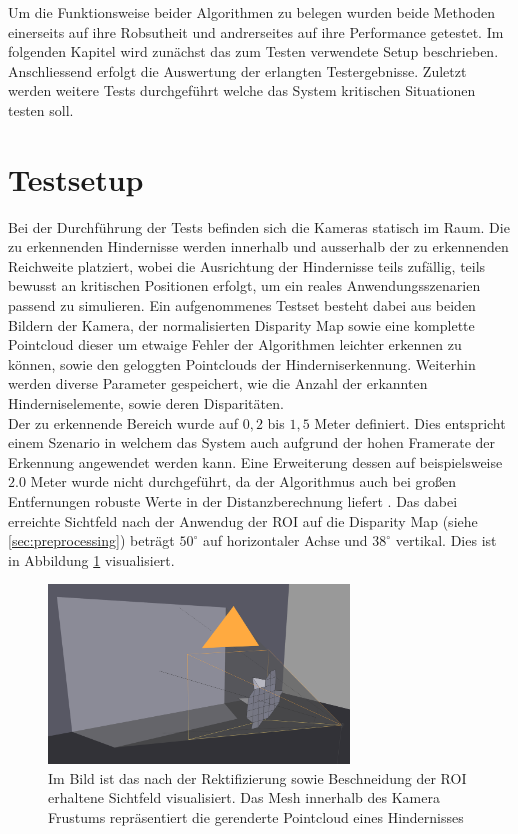 Um die Funktionsweise beider Algorithmen zu belegen wurden beide Methoden einerseits auf ihre Robsutheit und andrerseites auf ihre Performance getestet. Im folgenden Kapitel wird zunächst das zum Testen verwendete Setup beschrieben. Anschliessend erfolgt die Auswertung der erlangten Testergebnisse. Zuletzt werden weitere Tests durchgeführt welche das System kritischen Situationen testen soll.

\section{Testsetup}
\label{sec:test_setup}

Bei der Durchführung der Tests befinden sich die Kameras statisch im Raum. Die zu erkennenden Hindernisse werden innerhalb und ausserhalb der zu erkennenden Reichweite platziert, wobei die Ausrichtung der Hindernisse teils zufällig, teils bewusst an kritischen Positionen erfolgt, um ein reales Anwendungsszenarien passend zu simulieren. Ein aufgenommenes Testset besteht dabei aus beiden Bildern der Kamera, der normalisierten Disparity Map sowie eine komplette Pointcloud dieser um etwaige Fehler der Algorithmen leichter erkennen zu können, sowie den geloggten Pointclouds der Hinderniserkennung. Weiterhin werden diverse Parameter gespeichert, wie die Anzahl der erkannten Hinderniselemente, sowie deren Disparitäten.\\

\noindent
Der zu erkennende Bereich wurde auf $0,2$ bis $1,5$ Meter definiert. Dies entspricht einem Szenario in welchem das System auch aufgrund der hohen Framerate der Erkennung angewendet werden kann. Eine Erweiterung dessen auf beispielsweise $2.0$ Meter wurde nicht durchgeführt, da der Algorithmus auch bei großen Entfernungen robuste Werte in der Distanzberechnung liefert \cite{hilleralhallak}.
Das dabei erreichte Sichtfeld nach der Anwendug der ROI auf die Disparity Map (siehe \ref{sec:preprocessing}) beträgt $50^{\circ}$ auf horizontaler Achse und $38^{\circ}$ vertikal. Dies ist in Abbildung \ref{fig:field_of_view} visualisiert.
	
	\begin{figure}
		\centering
		\includegraphics[width=8cm]{img/viewport}
		\caption{Im Bild ist das nach der Rektifizierung sowie Beschneidung der ROI erhaltene Sichtfeld visualisiert. Das Mesh innerhalb des Kamera Frustums repräsentiert die gerenderte Pointcloud eines Hindernisses}
		\label{fig:field_of_view}
	\end{figure}

